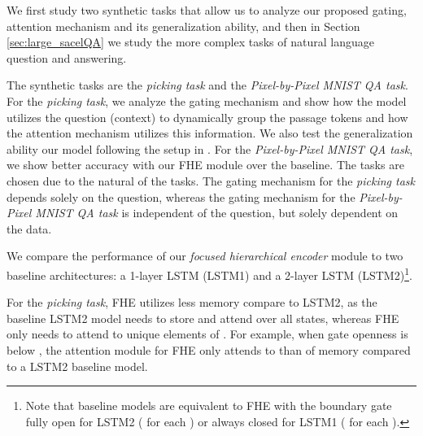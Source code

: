 We first study two synthetic tasks that allow us to analyze our proposed gating, attention mechanism and its generalization ability, and then in Section \ref{sec:large_sacelQA} we study the more complex tasks of natural language question and answering.

The synthetic tasks are the \emph{picking task} and the \emph{Pixel-by-Pixel MNIST QA task}. For the \emph{picking task}, we analyze the gating mechanism and show how the model utilizes the question (context) to dynamically group the passage tokens and how the attention mechanism utilizes this information. We also test the generalization ability our model following the setup in \cite{graves2014neural}. For the \emph{Pixel-by-Pixel MNIST QA task}, we show better accuracy with our FHE module over the baseline. The  tasks are chosen due to the natural of the tasks. The gating mechanism for the \emph{picking task} depends solely on the question, whereas the gating mechanism for the \emph{Pixel-by-Pixel MNIST QA task} is independent of the question, but solely dependent on the data.

We compare the performance of our \emph{focused hierarchical encoder} module to two baseline architectures: a 1-layer LSTM (LSTM1) and a 2-layer LSTM (LSTM2)\footnote{Note that baseline models are equivalent to FHE with the boundary gate fully open for LSTM2 ( for each ) or always closed for LSTM1 ( for each ).}. 

For the \emph{picking task}, FHE utilizes less memory compare to LSTM2, as the baseline LSTM2 model needs to store and attend over all states, whereas FHE only needs to attend to unique elements of . For example, when gate openness is below , the attention module for FHE only attends to than  of memory compared to a LSTM2 baseline model.

